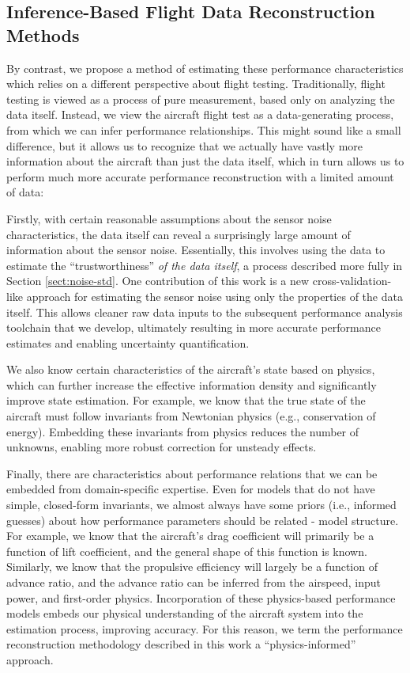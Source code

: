 \documentclass[conf]{new-aiaa}
\begin{document}
    \subsection{Inference-Based Flight Data Reconstruction Methods}

    By contrast, we propose a method of estimating these performance characteristics which relies on a different perspective about flight testing. Traditionally, flight testing is viewed as a process of pure measurement, based only on analyzing the data itself. Instead, we view the aircraft flight test as a data-generating process, from which we can infer performance relationships. This might sound like a small difference, but it allows us to recognize that we actually have vastly more information about the aircraft than just the data itself, which in turn allows us to perform much more accurate performance reconstruction with a limited amount of data:

    Firstly, with certain reasonable assumptions about the sensor noise characteristics, the data itself can reveal a surprisingly large amount of information about the sensor noise. Essentially, this involves using the data to estimate the ``trustworthiness'' \emph{of the data itself}, a process described more fully in Section \ref{sect:noise-std}. One contribution of this work is a new cross-validation-like approach for estimating the sensor noise using only the properties of the data itself. This allows cleaner raw data inputs to the subsequent performance analysis toolchain that we develop, ultimately resulting in more accurate performance estimates and enabling uncertainty quantification.

    We also know certain characteristics of the aircraft's state based on physics, which can further increase the effective information density and significantly improve state estimation. For example, we know that the true state of the aircraft must follow invariants from Newtonian physics (e.g., conservation of energy). Embedding these invariants from physics reduces the number of unknowns, enabling more robust correction for unsteady effects.

    Finally, there are characteristics about performance relations that we can be embedded from domain-specific expertise. Even for models that do not have simple, closed-form invariants, we almost always have some priors (i.e., informed guesses) about how performance parameters should be related - model structure. For example, we know that the aircraft's drag coefficient will primarily be a function of lift coefficient, and the general shape of this function is known. Similarly, we know that the propulsive efficiency will largely be a function of advance ratio, and the advance ratio can be inferred from the airspeed, input power, and first-order physics. Incorporation of these physics-based performance models embeds our physical understanding of the aircraft system into the estimation process, improving accuracy. For this reason, we term the performance reconstruction methodology described in this work a ``physics-informed'' approach.
\end{document}
